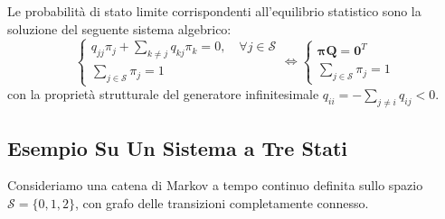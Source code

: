\documentclass[11pt, a4paper]{article}
\begin{document}
Le probabilità di stato limite corrispondenti all'equilibrio statistico sono la soluzione del seguente sistema algebrico:
\begin{equation}
    \begin{cases}
        \displaystyle q_{jj}\pi_j + \sum_{k \neq j} q_{kj}\pi_k = 0, \quad \forall j \in \mathcal{S} \\[10pt]
        \displaystyle \sum_{j \in \mathcal{S}} \pi_j = 1
    \end{cases}
    \iff
    \begin{cases}
        \bm{\pi}\bm{Q} = \bm{0}^T \\[6pt]
        \displaystyle \sum_{j \in \mathcal{S}} \pi_j = 1
    \end{cases}
\end{equation}
con la proprietà strutturale del generatore infinitesimale $q_{ii} = -\sum_{j \neq i} q_{ij} < 0$.

\subsection{Esempio Su Un Sistema a Tre Stati}

Consideriamo una catena di Markov a tempo continuo definita sullo spazio $\mathcal{S} = \{0, 1, 2\}$, con grafo delle transizioni completamente connesso.

\end{document}
